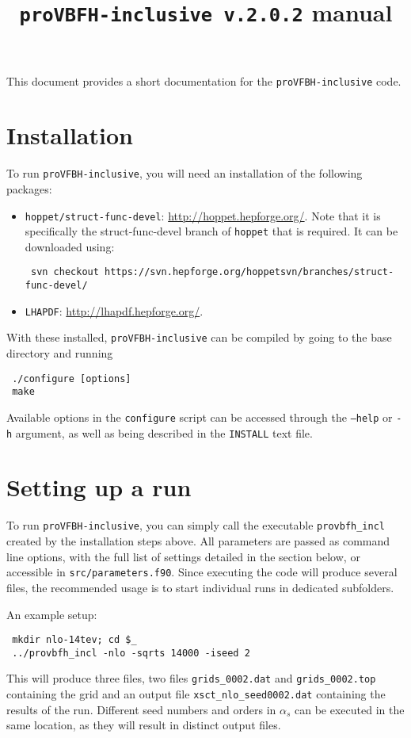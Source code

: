 \documentclass[12pt,a4]{article}
\title{\texttt{proVBFH-inclusive v.2.0.2} manual}
\newcommand{\provbfhincl}{\texttt{proVFBH-inclusive}\xspace}
\newcommand{\hoppet}{\texttt{hoppet}\xspace}
\begin{document}
\maketitle

This document provides a short documentation for the \provbfhincl code.

\section{Installation}
To run \provbfhincl, you will need an installation of the following packages:
\begin{itemize}
\item \texttt{hoppet/struct-func-devel}:
  \url{http://hoppet.hepforge.org/}.  Note that it is specifically the
  struct-func-devel branch of \hoppet that is required.  It can be
  downloaded using:
\begin{verbatim}
 svn checkout https://svn.hepforge.org/hoppetsvn/branches/struct-func-devel/
\end{verbatim}
\item \texttt{LHAPDF}: \url{http://lhapdf.hepforge.org/}.
\end{itemize}
With these installed, \provbfhincl can be compiled by going to the base
directory and running
\begin{verbatim}
 ./configure [options]
 make
\end{verbatim}
Available options in the \texttt{configure} script can be accessed
through the \texttt{--help} or \texttt{-h} argument, as well as being
described in the \texttt{INSTALL} text file.

\section{Setting up a run}
To run \provbfhincl, you can simply call the executable
\texttt{provbfh\_incl} created by the installation steps above.
%
All parameters are passed as command line options, with the full list
of settings detailed in the section below, or accessible in
\texttt{src/parameters.f90}.
%
Since executing the code will produce several files, the recommended
usage is to start individual runs in dedicated subfolders.

An example setup:
\begin{verbatim}
 mkdir nlo-14tev; cd $_
 ../provbfh_incl -nlo -sqrts 14000 -iseed 2
\end{verbatim}
This will produce three files, two files \texttt{grids\_0002.dat} and
\texttt{grids\_0002.top} containing the grid and an output file
\texttt{xsct\_nlo\_seed0002.dat} containing the results of the run.
%
Different seed numbers and orders in
$\alpha_s$ can be executed in the same location, as they will result
in distinct output files.
\end{document}
